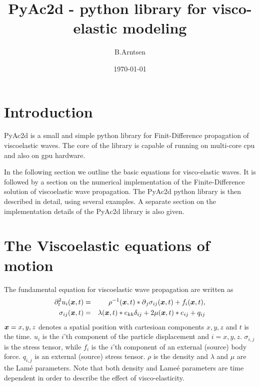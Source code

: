 \documentclass[11pt]{article}
\begin{document}
  
%
\newcommand{\dt}[1]{\partial_t{#1}}
\newcommand{\ddt}[1]{\partial^2_t{#1}}
\newcommand{\dddt}[1]{\partial^3_t{#1}}
\newcommand{\inv}[1]{\frac{1}{#1}}
\newcommand{\diff}[1]{D^+_{#1}}
\newcommand{\difb}[1]{D^-_{#1}}
\title{PyAc2d - python library for visco-elastic modeling} 
       
\author{B.Arntsen}
\date{\today}
\maketitle
\tableofcontents
\clearpage
\section{Introduction} 
PyAc2d is a small and simple python library for Finit-Difference 
propagation of viscoelastic waves. The core of the library is capable of running on
multi-core cpu and also on gpu hardware.

In the following section we outline the basic equations for visco-elastic waves.
It is followed by a section on the numerical implementation of the Finite-Difference
solution of viscoelastic wave propagation.
The PyAc2d python library is then described in detail, using several
examples. 
A separate section on the implementation details of the PyAc2d library is also given.

\section{The Viscoelastic equations of motion} 
The fundamental equation for viscoelastic wave propagation are written as
\cite{Hudson1985}
\begin{eqnarray}
  \ddt{u_i(\xx, t)} & = & \rho^{-1}(\xx,t)*\p_j \sigma_{ij}(\xx, t) 
                                               +f_i(\xx,t),     \nonumber\\
					   \label{eq:ve-v}
  \sigma_{ij}(\xx, t) & = & 
                            \lambda(\xx,t)* e_{kk}\delta_{ij} + 2\mu(\xx,t)* e_{ij} 
                                               +q_{ij}          \nonumber\\
					  \label{eq:ve-sigma}
\end{eqnarray}
$\mbox{\boldmath $x$}=x,y,z$ denotes a spatial position with cartesioan components $x,y,z$ and $t$ is
the time.
$u_i$ is the $i$'th component of the particle
displacement and $i=x,y,z$. $\sigma_{i,j}$ is the stress tensor, while
$f_i$ is the $i$'th component of an external (source) body force. 
$q_{i,j}$ is an external (source) stress tensor.
$\rho$ is the density and $\lambda$ and $\mu$ are the Lam\'{e} parameters.
Note that both density and Lame\'{e} parameters are time dependent in order
to describe the effect of visco-elasticity.
\end{document}
